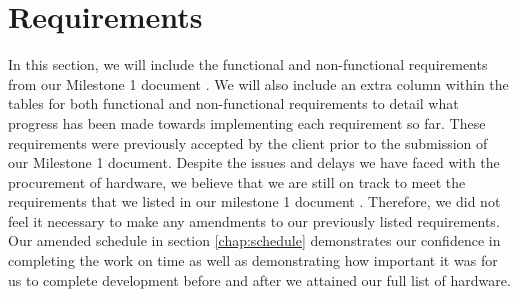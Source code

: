 \chapter{Requirements} \label{ch:Requirements}

In this section, we will include the functional and non-functional requirements from our Milestone 1 document \cite{coaker}. We will also include an extra column within the tables for both functional and non-functional requirements to detail what progress has been made towards implementing each requirement so far. These requirements were previously accepted by the client prior to the submission of our Milestone 1 document. Despite the issues and delays we have faced with the procurement of hardware, we believe that we are still on track to meet the requirements that we listed in our milestone 1 document \cite{coaker}. Therefore, we did not feel it necessary to make any amendments to our previously listed requirements. Our amended schedule in section \ref{chap:schedule} demonstrates our confidence in completing the work on time as well as demonstrating how important it was for us to complete development before and after we attained our full list of hardware.

